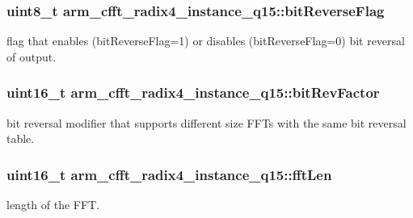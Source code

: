 \subsubsection[{\texorpdfstring{bit\+Reverse\+Flag}{bitReverseFlag}}]{\setlength{\rightskip}{0pt plus 5cm}uint8\+\_\+t arm\+\_\+cfft\+\_\+radix4\+\_\+instance\+\_\+q15\+::bit\+Reverse\+Flag}\hypertarget{structarm__cfft__radix4__instance__q15_a101e3f7b0bd6b5b14cd5214f23df4133}{}\label{structarm__cfft__radix4__instance__q15_a101e3f7b0bd6b5b14cd5214f23df4133}
flag that enables (bit\+Reverse\+Flag=1) or disables (bit\+Reverse\+Flag=0) bit reversal of output. 
\subsubsection[{\texorpdfstring{bit\+Rev\+Factor}{bitRevFactor}}]{\setlength{\rightskip}{0pt plus 5cm}uint16\+\_\+t arm\+\_\+cfft\+\_\+radix4\+\_\+instance\+\_\+q15\+::bit\+Rev\+Factor}\hypertarget{structarm__cfft__radix4__instance__q15_a6b010e5f02d1130c621e3d2e26b95df1}{}\label{structarm__cfft__radix4__instance__q15_a6b010e5f02d1130c621e3d2e26b95df1}
bit reversal modifier that supports different size F\+F\+Ts with the same bit reversal table. 
\subsubsection[{\texorpdfstring{fft\+Len}{fftLen}}]{\setlength{\rightskip}{0pt plus 5cm}uint16\+\_\+t arm\+\_\+cfft\+\_\+radix4\+\_\+instance\+\_\+q15\+::fft\+Len}\hypertarget{structarm__cfft__radix4__instance__q15_a5fc543e7d84ca8cb7cf6648970f21ca6}{}\label{structarm__cfft__radix4__instance__q15_a5fc543e7d84ca8cb7cf6648970f21ca6}
length of the F\+FT. 
